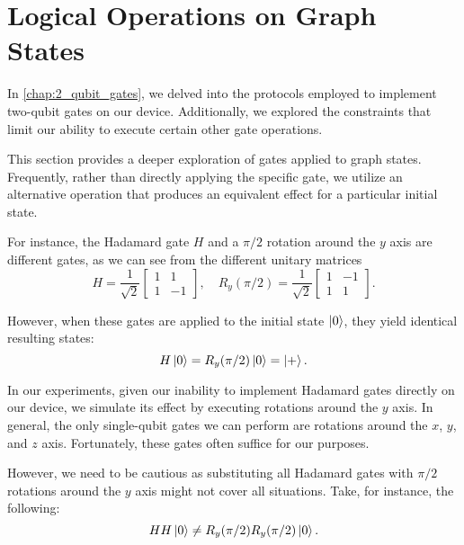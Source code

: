 \section{Logical Operations on Graph States}
\label{Sec:log_operation_graph}

In \cref{chap:2_qubit_gates}, we delved into the protocols employed to implement two-qubit gates on our device.
Additionally, we explored the constraints that limit our ability to execute certain other gate operations.

This section provides a deeper exploration of gates applied to graph states. 
Frequently, rather than directly applying the specific gate, we utilize an alternative operation that produces an equivalent effect for a particular initial state.

For instance, the Hadamard gate $H$ and a $\pi / 2$ rotation around the $y$ axis are different gates, as we can see from the different unitary matrices
\begin{equation}
    H = \frac{1}{\sqrt{2}}
    \begin{bmatrix}
        1 & 1 \\
        1 & -1
    \end{bmatrix} , \quad
    R_y(\pi / 2) = \frac{1}{\sqrt{2}}
    \begin{bmatrix}
        1 & -1 \\
        1 & 1
    \end{bmatrix} .
\end{equation}

However, when these gates are applied to the initial state $\ket{0}$, they yield identical resulting states:
\begin{equation}
    H \ket{0} = R_y(\pi/2) \ket{0} = \ket{+} .
\end{equation}

In our experiments, given our inability to implement Hadamard gates directly on our device, we simulate its effect by executing rotations around the $y$ axis.
In general, the only single-qubit gates we can perform are rotations around the $x$, $y$, and $z$ axis. 
Fortunately, these gates often suffice for our purposes.

However, we need to be cautious as substituting all Hadamard gates with $\pi / 2$ rotations around the $y$ axis might not cover all situations. 
Take, for instance, the following:
\begin{equation}
    H H \ket{0} \neq
    R_y(\pi / 2) R_y(\pi / 2) \ket{0} .
\end{equation}

